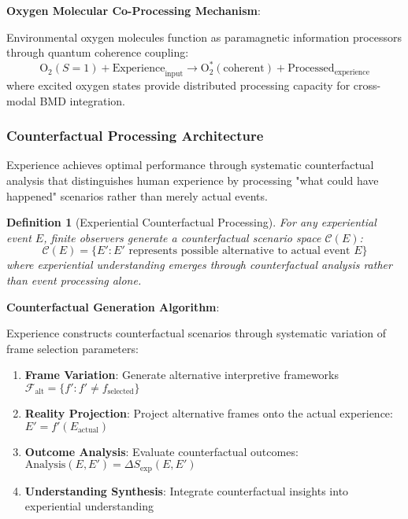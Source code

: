 \documentclass{article}
\newtheorem{definition}[theorem]{Definition}
\begin{document}
\textbf{Oxygen Molecular Co-Processing Mechanism}:

Environmental oxygen molecules function as paramagnetic information processors through quantum coherence coupling:
\begin{equation}
\text{O}_2(S=1) + \text{Experience}_{\text{input}} \rightarrow \text{O}_2^*(\text{coherent}) + \text{Processed}_{\text{experience}}
\end{equation}
where excited oxygen states provide distributed processing capacity for cross-modal BMD integration.

\subsubsection{Counterfactual Processing Architecture}

Experience achieves optimal performance through systematic counterfactual analysis that distinguishes human experience by processing "what could have happened" scenarios rather than merely actual events.

\begin{definition}[Experiential Counterfactual Processing]
For any experiential event $E$, finite observers generate a counterfactual scenario space $\mathcal{C}(E)$:
\begin{equation}
\mathcal{C}(E) = \{E' : E' \text{ represents possible alternative to actual event } E\}
\end{equation}
where experiential understanding emerges through counterfactual analysis rather than event processing alone.
\end{definition}

\textbf{Counterfactual Generation Algorithm}:

Experience constructs counterfactual scenarios through systematic variation of frame selection parameters:

\begin{enumerate}
\item \textbf{Frame Variation}: Generate alternative interpretive frameworks $\mathcal{F}_{\text{alt}} = \{f' : f' \neq f_{\text{selected}}\}$
\item \textbf{Reality Projection}: Project alternative frames onto the actual experience: $E' = f'(E_{\text{actual}})$  
\item \textbf{Outcome Analysis}: Evaluate counterfactual outcomes: $\text{Analysis}(E, E') = \Delta S_{\text{exp}}(E, E')$
\item \textbf{Understanding Synthesis}: Integrate counterfactual insights into experiential understanding
\end{enumerate}
\end{document}
